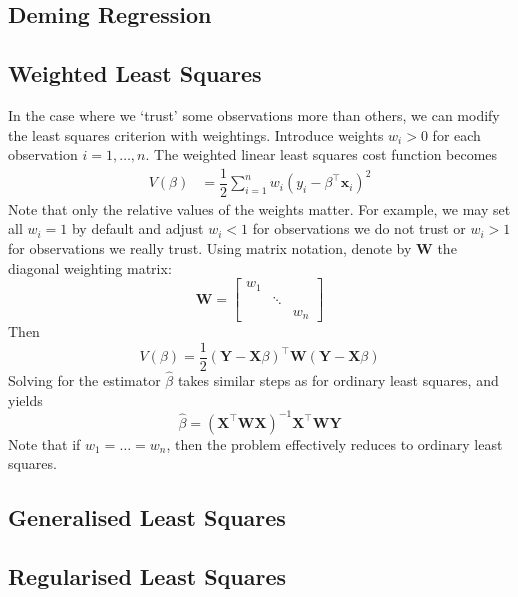 \documentclass[11pt]{report} %
\begin{document}
\subsection{Deming Regression}

\subsection{Weighted Least Squares}

In the case where we `trust' some observations more than others, we can modify the least squares criterion with weightings. Introduce weights $w_{i} > 0$ for each observation $i = 1, \dots, n$. The weighted linear least squares cost function becomes
\begin{align}
V\left(\beta\right) &= \dfrac{1}{2}\sum_{i = 1}^{n}w_{i}\left(y_{i} - \beta^{\top}\mathbf{x}_{i}\right)^{2}
\end{align}
Note that only the relative values of the weights matter. For example, we may set all $w_{i} = 1$ by default and adjust $w_{i} < 1$ for observations we do not trust or $w_{i} > 1$ for observations we really trust. Using matrix notation, denote by $\mathbf{W}$ the diagonal weighting matrix:
\begin{equation}
\mathbf{W} = \begin{bmatrix}
w_{1} & & \\ & \ddots & \\ & & w_{n}
\end{bmatrix}
\end{equation}
Then
\begin{equation}
V\left(\beta\right) = \dfrac{1}{2}\left(\mathbf{Y} - \mathbf{X}\beta\right)^{\top}\mathbf{W}\left(\mathbf{Y} - \mathbf{X}\beta\right)
\end{equation}
Solving for the estimator $\hat{\beta}$ takes similar steps as for ordinary least squares, and yields
\begin{equation}
\hat{\beta} = \left(\mathbf{X}^{\top}\mathbf{W}\mathbf{X}\right)^{-1}\mathbf{X}^{\top}\mathbf{W}\mathbf{Y}
\end{equation}
Note that if $w_{1} = \dots = w_{n}$, then the problem effectively reduces to ordinary least squares.

\subsection{Generalised Least Squares}

\subsection{Regularised Least Squares}
\end{document}
